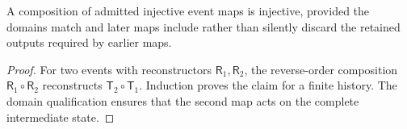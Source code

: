 \setcounter{theorem}{1}
\begin{proposition}
A composition of admitted injective event maps is injective, provided the domains match and later maps include rather than silently discard the retained outputs required by earlier maps.
\end{proposition}
\begin{proof}
For two events with reconstructors $\mathsf R_1,\mathsf R_2$, the reverse-order composition $\mathsf R_1\circ\mathsf R_2$ reconstructs $\mathsf T_2\circ\mathsf T_1$. Induction proves the claim for a finite history. The domain qualification ensures that the second map acts on the complete intermediate state.
\end{proof}
